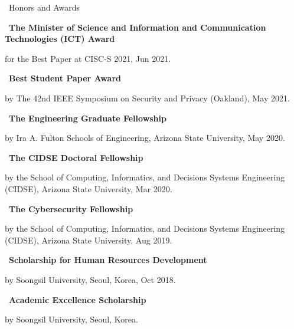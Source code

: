 \documentclass{resume} %
\begin{document}
\newpage
\begin{rSection}{\faGenderless~Honors and Awards}
	\strut\textbullet~{\bf The Minister of Science and Information and Communication Technologies (ICT) Award}\\
    \strut\hspace{1cm}\parbox[t]{\linegoal}{for the Best Paper at CISC-S 2021, Jun 2021.}

	\strut\textbullet~{\bf Best Student Paper Award}\\
    \strut\hspace{1cm}\parbox[t]{\linegoal}{by The 42nd IEEE Symposium on Security and Privacy (Oakland), May 2021.}

    \strut\textbullet~{\bf The Engineering Graduate Fellowship}\\
    \strut\hspace{1cm}\parbox[t]{\linegoal}{by Ira A. Fulton Schools of Engineering, Arizona State University, May 2020.}

    \strut\textbullet~{\bf The CIDSE Doctoral Fellowship}\\
    \strut\hspace{1cm}\parbox[t]{\linegoal}{by the School of Computing, Informatics, and Decisions Systems Engineering (CIDSE), Arizona State University, Mar 2020.}

    \strut\textbullet~{\bf The Cybersecurity Fellowship}\\
    \strut\hspace{1cm}\parbox[t]{\linegoal}{by the School of Computing, Informatics, and Decisions Systems Engineering (CIDSE), Arizona State University, Aug 2019.}

	\strut\textbullet~{\bf Scholarship for Human Resources Development}\\
	\strut\hspace{1cm}by Soongsil University, Seoul, Korea, Oct 2018.


	\strut\textbullet~{\bf Academic Excellence Scholarship}\\
	\strut\hspace{1cm}by Soongsil University, Seoul, Korea.


	\vspace{3mm}
\end{rSection}
\end{document}
